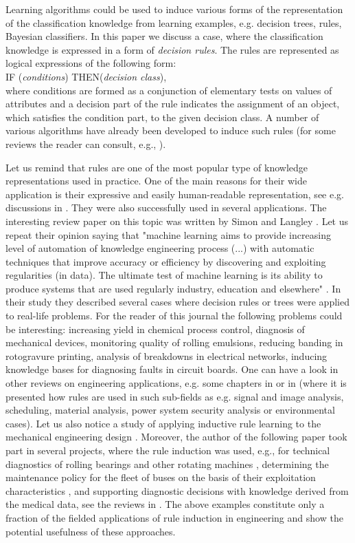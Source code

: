 \documentclass{elsart}
\begin{document}
Learning algorithms could be used to induce various forms of the
representation of the classification knowledge from learning examples, e.g.
decision trees, rules, Bayesian classifiers. In this paper we discuss a
case, where the classification knowledge is expressed in a form of
\emph{decision rules}. The rules are represented as logical expressions of
the following form:\\
 \hspace*{3cm} IF (\emph{conditions})
THEN(\emph{decision class}),
\\ where conditions are formed as a conjunction of elementary tests
on values of attributes and a decision part of the rule indicates the
assignment of an object, which satisfies the condition part, to the given
decision class. A number of various algorithms have already been developed
to induce such rules (for some reviews the reader can consult, e.g.,
\cite{LERS,MBK98,Stef01hab,Zyt02}).

Let us remind that rules are one of the most popular type of knowledge
representations used in practice. One of the main reasons for their wide
application is their expressive and easily human-readable representation,
see e.g. discussions in \cite{MBK98,Zyt02}. They were also successfully used
in several applications. The interesting review paper on this topic was
written by Simon and Langley \cite{LS98}. Let us repeat their opinion saying
that "machine learning aims to provide increasing level of automation of
knowledge engineering process (...) with automatic techniques that improve
accuracy or efficiency by discovering and exploiting regularities (in data).
The ultimate test of machine learning is its ability to produce systems that
are used regularly industry, education and elsewhere" \cite{LS98}. In their
study they described several cases where decision rules or trees were
applied to real-life problems. For the reader of this journal the following
problems  could be interesting: increasing yield in chemical process
control, diagnosis of mechanical devices, monitoring quality of rolling
emulsions, reducing banding in rotogravure printing, analysis of breakdowns
in electrical networks, inducing knowledge bases for diagnosing faults in
circuit boards. One can have a look in other reviews on engineering
applications, e.g. some chapters in \cite{MBK98,Zyt02} or in  \cite{pal99}
(where it is presented how rules are used in such sub-fields as e.g. signal
and image analysis, scheduling, material analysis, power system security
analysis or environmental cases). Let us also notice a study of applying
inductive rule learning to the mechanical engineering design \cite{Mo98}.
Moreover, the author of the following paper took part in several projects,
where the rule induction was used, e.g., for technical diagnostics of
rolling bearings and other rotating machines \cite{nowicki92}, determining
the maintenance policy for the fleet of buses on the basis of their
exploitation characteristics \cite{buses}, and supporting diagnostic
decisions with knowledge derived from the medical data, see the reviews in
\cite{Stef01hab}. The above examples constitute only a fraction of the
fielded applications of rule induction in engineering and show the potential
usefulness of these approaches.
\end{document}
